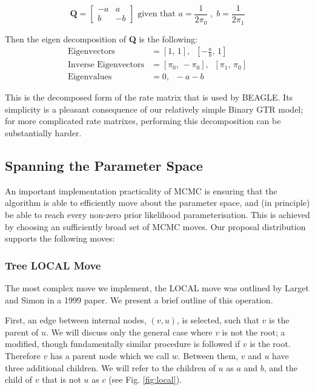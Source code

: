 \documentclass[10pt,journal,compsoc]{IEEEtran}
\begin{document}
\begin{equation}
    \textbf{Q} = \begin{bmatrix}
-a & a\\
b & -b
\end{bmatrix} \text{ \ given that \ } a = \frac{1}{2 \pi_0} \;,\; b = \frac{1}{2 \pi_1}
\end{equation}

\noindent Then the eigen decomposition of \textbf{Q} is the following:
\begin{align*}
    \text{Eigenvectors} &= [1,\, 1],\;\;  [-\frac{a}{b},\, 1] \\
    \text{Inverse Eigenvectors} &= [\pi_0,\, -\pi_0],\;\;  [\pi_1,\, \pi_0]\\
    \text{Eigenvalues} &= 0,\;\; -a-b
\end{align*}

This is the decomposed form of the rate matrix that is used by BEAGLE. Its simplicity is a pleasant consequence of our relatively simple Binary GTR model; for more complicated rate matrixes, performing this decomposition can be substantially harder.

\subsection{Spanning the Parameter Space}

An important implementation practicality of MCMC is ensuring that the algorithm is able to efficiently move about the parameter space, and (in principle) be able to reach every non-zero prior likelihood parameterisation. This is achieved by choosing an sufficiently broad set of MCMC moves. Our proposal distribution supports the following moves:

\subsubsection{Tree LOCAL Move}

The most complex move we implement, the LOCAL move was outlined by Larget and Simon in a 1999 paper. We present a brief outline of this operation.

First, an edge between internal nodes, $(v, u)$, is selected, such that $v$ is the parent of $u$. We will discuss only the general case where $v$ is not the root; a modified, though fundamentally similar procedure is followed if $v$ is the root. Therefore $v$ has a parent node which we call $w$. Between them, $v$ and $u$ have three additional children. We will refer to the children of $u$ as $a$ and $b$, and the child of $v$ that is not $u$ as $c$ (see Fig. \ref{fig:local}).
\end{document}
